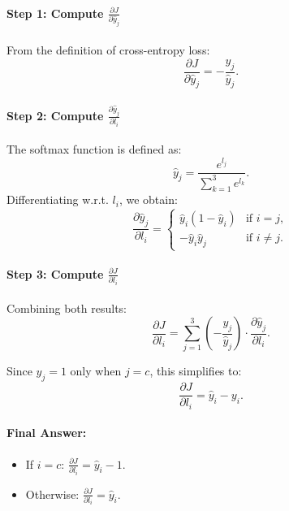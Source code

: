 \begin{parts}
{\begin{enumerate}[label=\roman*.]
{            \paragraph{Step 1: Compute $\frac{\partial J}{\partial \hat{y}_j}$}
            From the definition of cross-entropy loss:
            $$
            \frac{\partial J}{\partial \hat{y}_j} = - \frac{y_j}{\hat{y}_j}.
            $$

            \paragraph{Step 2: Compute $\frac{\partial \hat{y}_j}{\partial l_i}$}
            The softmax function is defined as:
            $$
            \hat{y}_j = \frac{e^{l_j}}{\sum_{k=1}^{3} e^{l_k}}.
            $$
            Differentiating w.r.t. $l_i$, we obtain:
            $$
            \frac{\partial \hat{y}_j}{\partial l_i} =
            \begin{cases}
            \hat{y}_i (1 - \hat{y}_i) & \text{if } i = j, \\
            -\hat{y}_i \hat{y}_j & \text{if } i \neq j.
            \end{cases}
            $$

            \paragraph{Step 3: Compute $\frac{\partial J}{\partial l_i}$}
            Combining both results:
            $$
            \frac{\partial J}{\partial l_i} =
            \sum_{j=1}^{3} \left(- \frac{y_j}{\hat{y}_j} \right) \cdot \frac{\partial \hat{y}_j}{\partial l_i}.
            $$

            Since $y_j = 1$ only when $j = c$, this simplifies to:
            $$
            \frac{\partial J}{\partial l_i} = \hat{y}_i - y_i.
            $$

            \paragraph{Final Answer:}
            \begin{itemize}
                \item If $i = c$: \quad $\frac{\partial J}{\partial l_i} = \hat{y}_i - 1$.
                \item Otherwise: \quad $\frac{\partial J}{\partial l_i} = \hat{y}_i$.
            \end{itemize}
        }


\end{enumerate}}
\end{parts}

